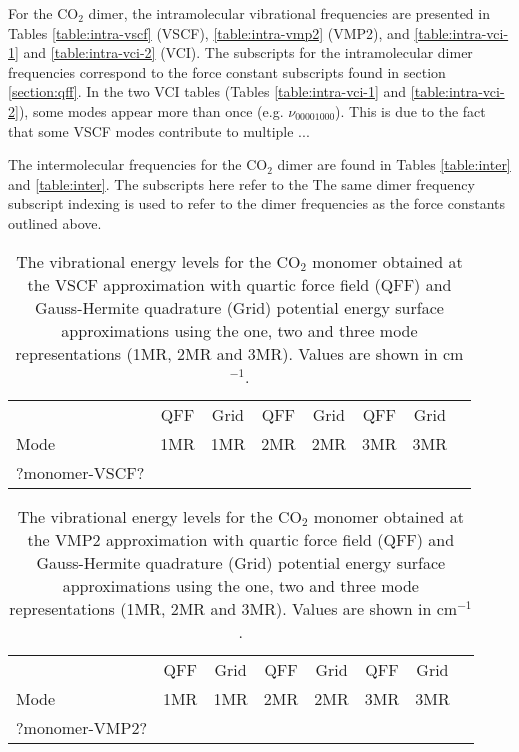 \documentclass[aip,jcp,showpacs,superscriptaddress,groupedaddress]{revtex4-1}  %
\begin{document}
For the CO$_2$ dimer, the intramolecular vibrational frequencies are presented in Tables \ref{table:intra-vscf} (VSCF), \ref{table:intra-vmp2} (VMP2),  and \ref{table:intra-vci-1} and \ref{table:intra-vci-2} (VCI). The subscripts for the intramolecular dimer frequencies correspond to the force constant subscripts found in section \ref{section:qff}. In the two VCI tables (Tables \ref{table:intra-vci-1} and \ref{table:intra-vci-2}), some modes appear more than once (e.g. $\nu_{00001000}$). This is due to the fact that some VSCF modes contribute to multiple ...

The intermolecular frequencies for the CO$_2$ dimer are found in Tables \ref{table:inter} and \ref{table:inter}. The subscripts here refer to the The same dimer frequency subscript indexing is used to refer to the dimer frequencies as the force constants outlined above.

\begin{table}[h]
\caption{The vibrational energy levels for the CO$_2$ monomer obtained at the VSCF approximation with quartic force field (QFF) and Gauss-Hermite quadrature (Grid) potential energy surface approximations using the one, two and three mode representations (1MR, 2MR and 3MR). Values are shown in cm$^{-1}$.}
\begin{ruledtabular}
\begin{tabular}{lccccccc}
    & QFF &  Grid & QFF & Grid & QFF & Grid   \\  
  Mode & 1MR & 1MR & 2MR & 2MR & 3MR & 3MR   \\ 
\hline \Tstrut
?monomer-VSCF?
\end{tabular}
\end{ruledtabular}
\label{table:monomer-vscf}
\end{table}  

\begin{table}[h]
\caption{The vibrational energy levels for the CO$_2$ monomer obtained at the VMP2 approximation with quartic force field (QFF) and Gauss-Hermite quadrature (Grid) potential energy surface approximations using the one, two and three mode representations (1MR, 2MR and 3MR). Values are shown in cm$^{-1}$.}
\begin{ruledtabular}
\begin{tabular}{lccccccc}
    & QFF &  Grid & QFF & Grid & QFF & Grid   \\  
  Mode & 1MR & 1MR & 2MR & 2MR & 3MR & 3MR   \\ 
\hline \Tstrut
?monomer-VMP2?
\end{tabular}
\end{ruledtabular}
\label{table:monomer-vmp2}
\end{table}
\end{document}
